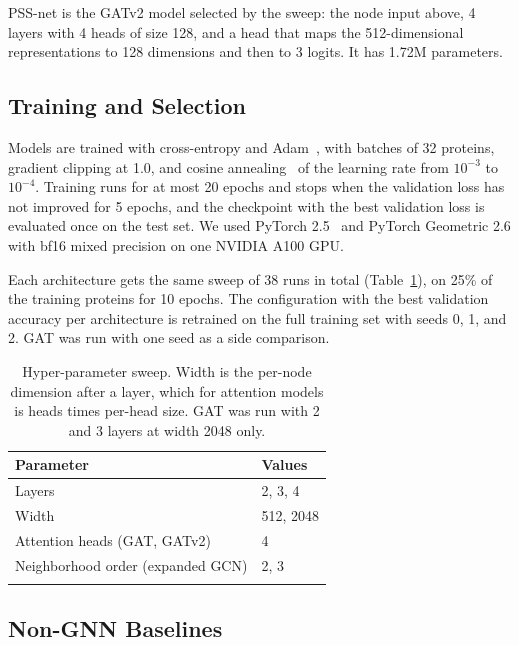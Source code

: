 \documentclass[pdflatex,sn-mathphys-num]{sn-jnl}
\begin{document}
PSS-net is the GATv2 model selected by the sweep: the node input above, 4 layers with 4 heads of size 128, and a head that maps the 512-dimensional representations to 128 dimensions and then to 3 logits. It has 1.72M parameters.

\subsection{Training and Selection}

Models are trained with cross-entropy and Adam~\cite{kingma2017adammethodstochasticoptimization}, with batches of 32 proteins, gradient clipping at 1.0, and cosine annealing~\cite{loshchilov2017sgdrstochasticgradientdescent} of the learning rate from $10^{-3}$ to $10^{-4}$. Training runs for at most 20 epochs and stops when the validation loss has not improved for 5 epochs, and the checkpoint with the best validation loss is evaluated once on the test set. We used PyTorch 2.5~\cite{paszke2019pytorch} and PyTorch Geometric 2.6 with bf16 mixed precision on one NVIDIA A100 GPU.

Each architecture gets the same sweep of 38 runs in total (Table~\ref{tab:sweep}), on 25\% of the training proteins for 10 epochs. The configuration with the best validation accuracy per architecture is retrained on the full training set with seeds 0, 1, and 2. GAT was run with one seed as a side comparison.

\begin{table}[t]
\caption{Hyper-parameter sweep. Width is the per-node dimension after a layer, which for attention models is heads times per-head size. GAT was run with 2 and 3 layers at width 2048 only.}
\label{tab:sweep}
\begin{tabular}{ll}
\toprule
Parameter & Values \\
\midrule
Layers & 2, 3, 4 \\
Width & 512, 2048 \\
Attention heads (GAT, GATv2) & 4 \\
Neighborhood order (expanded GCN) & 2, 3 \\
\botrule
\end{tabular}
\end{table}

\subsection{Non-GNN Baselines}
\end{document}
